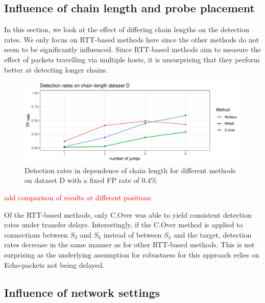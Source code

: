 \documentclass[runningheads]{llncs}\usepackage[]{graphicx}\usepackage[]{color}
\makeatletter
\def\maxwidth{ %
  \ifdim\Gin@nat@width>\linewidth
    \linewidth
  \else
    \Gin@nat@width
  \fi
}
\newenvironment{knitrout}{}{} %
\makeatother
\begin{document}
\subsection{Influence of chain length and probe placement}

In this section, we look at the effect of differing chain lengths on the detection rates. We only focus on RTT-based methods here since the other methods do not seem to be significantly influenced. Since RTT-based methods aim to measure the effect of packets travelling via multiple hosts, it is unsurprising that they perform better at detecting longer chains. 

\begin{knitrout}
\color{fgcolor}\begin{figure}
\includegraphics[width=\maxwidth]{figure/Influencechainl-1} \caption[Detection rates in dependence of chain length for different methods on dataset D with a fixed FP rate of $0.4\%$]{Detection rates in dependence of chain length for different methods on dataset D with a fixed FP rate of $0.4\%$}\label{fig:Influencechainl}
\end{figure}


\end{knitrout}

\textcolor{red}{add comparison of results at different positions}

Of the RTT-based methods, only C.Over was able to yield consistent detection rates under transfer delays. 
Interestingly, if the C.Over method is applied to connections between $S_3$ and $S_4$ instead of between $S_4$ and the target, detection rates decrease in the same manner as for other RTT-based methods. This is not surprising as the underlying assumption for robustness for this approach relies on Echo-packets not being delayed.




\subsection{Influence of network settings}
\end{document}
